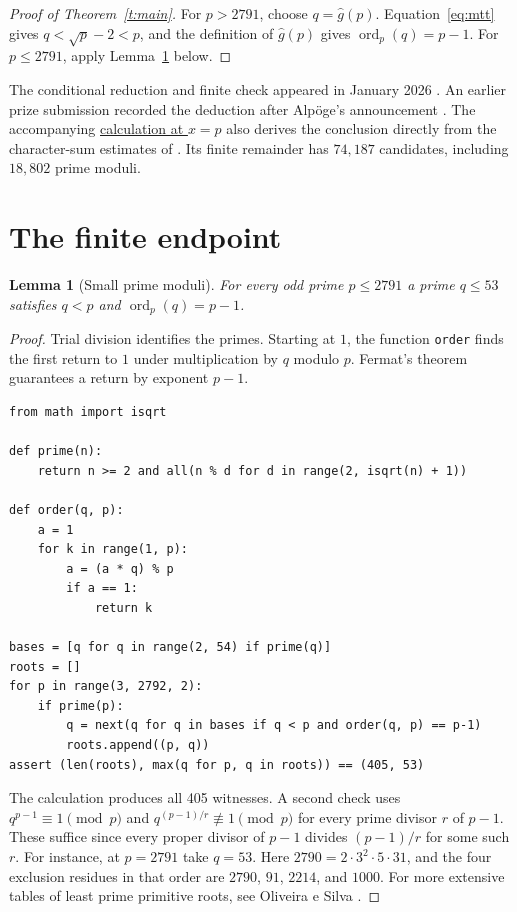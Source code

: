 \documentclass[11pt,letterpaper]{amsart}
\newtheorem{lemma}[theorem]{Lemma}
\newcommand{\ord}{\operatorname{ord}}
\newcommand{\gr}{\widehat g}
\begin{document}
\begin{proof}[Proof of Theorem~\ref{t:main}]
For \(p>2791\), choose \(q=\gr(p)\). Equation~\eqref{eq:mtt} gives
\(q<\sqrt p-2<p\), and the definition of \(\gr(p)\) gives \(\ord_p(q)=p-1\).
For \(p\le2791\), apply Lemma~\ref{l:finite} below.
\end{proof}

The conditional reduction and finite check appeared in January 2026
\cite{jan}. An earlier prize submission recorded the deduction after
Alp\"oge's announcement \cite{prior}. The accompanying
\href{https://github.com/H0W4RD-dev/erdos-985-prime-primitive-root/blob/main/endpoint.md}{calculation at \(x=p\)}
also derives the conclusion directly from the character-sum estimates
of \cite[Lemma~1]{mtt}. Its finite remainder has \(74{,}187\) candidates,
including \(18{,}802\) prime moduli.

\newpage
\section{The finite endpoint}
\begin{lemma}[Small prime moduli]\label{l:finite}
For every odd prime \(p\le2791\) a prime \(q\le53\) satisfies \(q<p\) and
\(\ord_p(q)=p-1\).
\end{lemma}
\begin{proof}
Trial division identifies the primes. Starting at \(1\), the function
\texttt{order} finds the first return to \(1\) under multiplication by \(q\)
modulo \(p\). Fermat's theorem guarantees a return by exponent \(p-1\).
\begin{Verbatim}[fontsize=\small,xleftmargin=1.7em]
from math import isqrt

def prime(n):
    return n >= 2 and all(n % d for d in range(2, isqrt(n) + 1))

def order(q, p):
    a = 1
    for k in range(1, p):
        a = (a * q) % p
        if a == 1:
            return k

bases = [q for q in range(2, 54) if prime(q)]
roots = []
for p in range(3, 2792, 2):
    if prime(p):
        q = next(q for q in bases if q < p and order(q, p) == p-1)
        roots.append((p, q))
assert (len(roots), max(q for p, q in roots)) == (405, 53)
\end{Verbatim}
The calculation produces all 405 witnesses. A second check uses
\(q^{p-1}\equiv1\pmod p\) and \(q^{(p-1)/r}\not\equiv1\pmod p\) for every prime
divisor \(r\) of \(p-1\). These suffice since every proper divisor of \(p-1\)
divides \((p-1)/r\) for some such \(r\). For instance, at \(p=2791\) take \(q=53\).
Here \(2790=2\cdot3^2\cdot5\cdot31\), and the four exclusion residues in that
order are \(2790\), \(91\), \(2214\), and \(1000\). For more extensive tables
of least prime primitive roots, see Oliveira e Silva \cite{tos}.
\end{proof}
\end{document}
